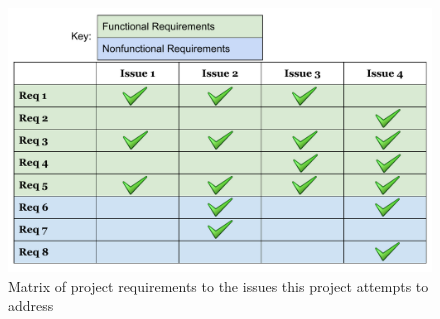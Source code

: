 \begin{figure}[H]
  \centering
      \includegraphics[width=1\textwidth]{images/issues_to_req_matrix.pdf}
  \caption{Matrix of project requirements to the issues this project attempts to
address}
\end{figure}
